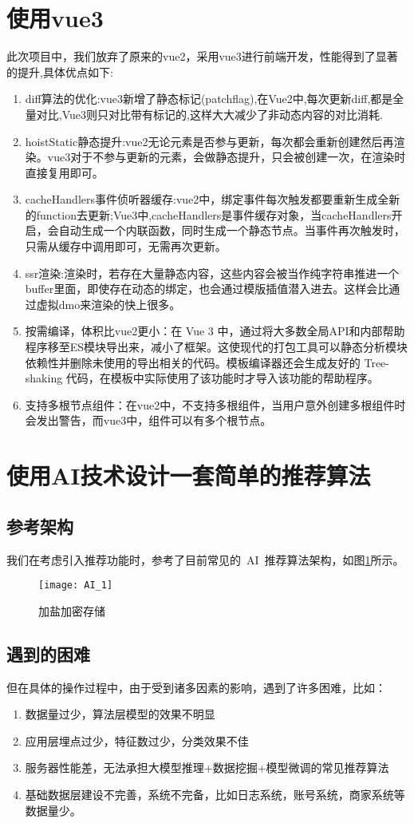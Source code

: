 \section{使用vue3}
此次项目中，我们放弃了原来的vue2，采用vue3进行前端开发，性能得到了显著的提升,具体优点如下:
\begin{enumerate}
	\item {diff算法的优化}:vue3新增了静态标记(patchflag),在Vue2中,每次更新diff,都是全量对比,Vue3则只对比带有标记的,这样大大减少了非动态内容的对比消耗.
	\item {hoistStatic静态提升}:vue2无论元素是否参与更新，每次都会重新创建然后再渲染。vue3对于不参与更新的元素，会做静态提升，只会被创建一次，在渲染时直接复用即可。
	\item {cacheHandlers事件侦听器缓存}:vue2中，绑定事件每次触发都要重新生成全新的function去更新;Vue3中,cacheHandlers是事件缓存对象，当cacheHandlers开启，会自动生成一个内联函数，同时生成一个静态节点。当事件再次触发时，只需从缓存中调用即可，无需再次更新。
	\item {ssr渲染}:渲染时，若存在大量静态内容，这些内容会被当作纯字符串推进一个buffer里面，即使存在动态的绑定，也会通过模版插值潜入进去。这样会比通过虚拟dmo来渲染的快上很多。
	\item {按需编译，体积比vue2更小}：在 Vue 3 中，通过将大多数全局API和内部帮助程序移至ES模块导出来，减小了框架。这使现代的打包工具可以静态分析模块依赖性并删除未使用的导出相关的代码。模板编译器还会生成友好的 Tree-shaking 代码，在模板中实际使用了该功能时才导入该功能的帮助程序。
	\item {支持多根节点组件}：在vue2中，不支持多根组件，当用户意外创建多根组件时会发出警告，而vue3中，组件可以有多个根节点。
\end{enumerate}

\section{使用AI技术设计一套简单的推荐算法}
\subsection{参考架构}
我们在考虑引入推荐功能时，参考了目前常见的~AI~推荐算法架构，如图\ref{fig:AI_1}所示。
\begin{figure}[htbp]
	\centering
	\texttt{[image: AI\_1]}
	\caption{加盐加密存储}
	\label{fig:AI_1}
	\vspace{\baselineskip}
\end{figure}

\subsection{遇到的困难}
但在具体的操作过程中，由于受到诸多因素的影响，遇到了许多困难，比如：
\begin{enumerate}
	\item 数据量过少，算法层模型的效果不明显
	\item 应用层埋点过少，特征数过少，分类效果不佳
	\item 服务器性能差，无法承担大模型推理+数据挖掘+模型微调的常见推荐算法
	\item 基础数据层建设不完善，系统不完备，比如日志系统，账号系统，商家系统等数据量少。
\end{enumerate}
